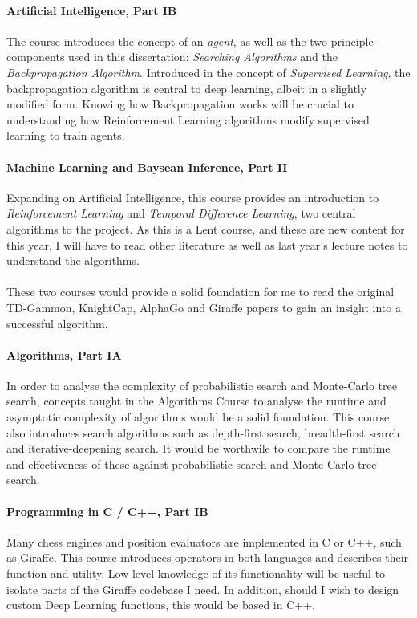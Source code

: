 \documentclass[a4paper]{article}
\begin{document}
\paragraph{Artificial Intelligence, Part IB} The course introduces the concept of an \textit{agent}, as well as the two principle components used in this dissertation: \textit{Searching Algorithms} and the \textit{Backpropagation Algorithm}. Introduced in the concept of \textit{Supervised Learning}, the backpropagation algorithm is central to deep learning, albeit in a slightly modified form. Knowing how Backpropagation works will be crucial to understanding how Reinforcement Learning algorithms modify supervised learning to train agents.

\paragraph{Machine Learning and Baysean Inference, Part II} Expanding on Artificial Intelligence, this course provides an introduction to \textit{Reinforcement Learning} and \textit{Temporal Difference Learning}, two central algorithms to the project. As this is a Lent course, and these are new content for this year, I will have to read other literature as well as last year's lecture notes to understand the algorithms.

\paragraph{}These two courses would provide a solid foundation for me to read the original TD-Gammon, KnightCap, AlphaGo and Giraffe papers to gain an insight into a successful algorithm.

\paragraph{Algorithms, Part IA} In order to analyse the complexity of probabilistic search and Monte-Carlo tree search, concepts taught in the Algorithms Course to analyse the runtime and asymptotic complexity of algorithms would be a solid foundation. This course also introduces search algorithms such as depth-first search, breadth-first search and iterative-deepening search. It would be worthwile to compare the runtime and effectiveness of these against probabilistic search and Monte-Carlo tree search.

\paragraph{Programming in C / C++, Part IB} Many chess engines and position evaluators are implemented in C or C++, such as Giraffe. This course introduces operators in both languages and describes their function and utility. Low level knowledge of its functionality will be useful to isolate parts of the Giraffe codebase I need. In addition, should I wish to design custom Deep Learning functions, this would be based in C++.
\end{document}
